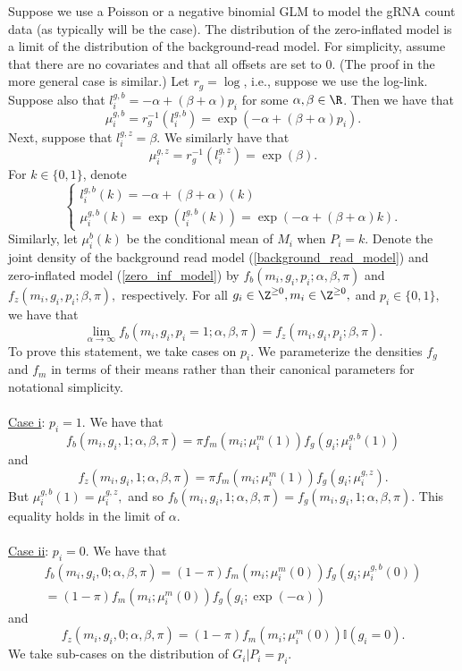 \documentclass[12pt]{article}
\begin{document}
Suppose we use a Poisson or a negative binomial GLM to model the gRNA count data (as typically will be the case). The distribution of the zero-inflated model is a limit of the distribution of the background-read model. For simplicity, assume that there are no covariates and that all offsets are set to $0$. (The proof in the more general case is similar.) Let $r_g = \log$, i.e., suppose we use the log-link. Suppose also that $l_i^{g,b} = -\alpha + (\beta + \alpha)p_i$ for some $\alpha, \beta \in \R$. Then we have that $$\mu_i^{g,b} = r_g^{-1}( l_i^{g,b}) = \exp\left( -\alpha + (\beta + \alpha) p_i \right).$$ Next, suppose that $l_i^{g,z} = \beta.$ We similarly have that
$$\mu_i^{g,z} = r_g^{-1}( l_i^{g,z}) = \exp \left(\beta \right).$$ For $k \in \{ 0,1\}$, denote $$ \begin{cases} l_i^{g,b}(k) = -\alpha + (\beta + \alpha)(k) \\ \mu_{i}^{g,b}(k) = \exp( l_i^{g,b}(k) ) = \exp\left( -\alpha + (\beta + \alpha)k \right).\end{cases}$$ Similarly, let $\mu^b_i(k)$ be the conditional mean of $M_i$ when $P_i = k$. Denote the joint density of the background read model (\ref{background_read_model}) and zero-inflated model (\ref{zero_inf_model}) by $f_b(m_i, g_i, p_i; \alpha, \beta, \pi)$ and $f_z(m_i, g_i, p_i; \beta, \pi),$ respectively. For all $g_i \in \Z^{\geq 0}, m_i \in \Z^{\geq 0},$ and $p_i \in \{0, 1\},$ we have that
$$ \lim_{\alpha \to \infty} f_b(m_i, g_i, p_i = 1; \alpha, \beta, \pi) = f_z(m_i, g_i, p_i; \beta, \pi).$$ To prove this statement, we take cases on $p_i$. We parameterize the densities $f_g$ and $f_m$ in terms of their means rather than their canonical parameters for notational simplicity.
\noindent \\ \\
\underline{Case i}: $p_i = 1$. We have that
$$
f_b(m_i, g_i, 1; \alpha, \beta, \pi) = \pi f_m( m_i; \mu^m_i(1) ) f_g(g_i; \mu_i^{g,b}(1)) $$ and
$$ f_z(m_i, g_i, 1; \alpha, \beta, \pi) = \pi f_m(m_i; \mu_i^m(1)) f_g(g_i; \mu_i^{g,z}).$$ But $\mu_i^{g,b}(1) = \mu_i^{g,z},$ and so $f_b(m_i, g_i, 1; \alpha, \beta, \pi) = f_g(m_i, g_i, 1; \alpha, \beta, \pi)$. This equality holds in the limit of $\alpha$.
\noindent \\ \\
\underline{Case ii}: $p_i = 0$. We have that
\begin{multline*} f_b(m_i, g_i, 0; \alpha, \beta, \pi) = (1-\pi) f_m(m_i; \mu_i^m(0)) f_g(g_i; \mu_i^{g,b}(0)) \\= (1 - \pi) f_m(m_i; \mu_i^m(0)) f_g(g_i; \exp(-\alpha)) \end{multline*} and
$$ f_z(m_i, g_i, 0; \alpha, \beta, \pi) = (1-\pi)f_m(m_i; \mu_i^m(0)) \mathbb{I}(g_i = 0).$$ We take sub-cases on the distribution of $G_i | P_i = p_i$.
\end{document}
